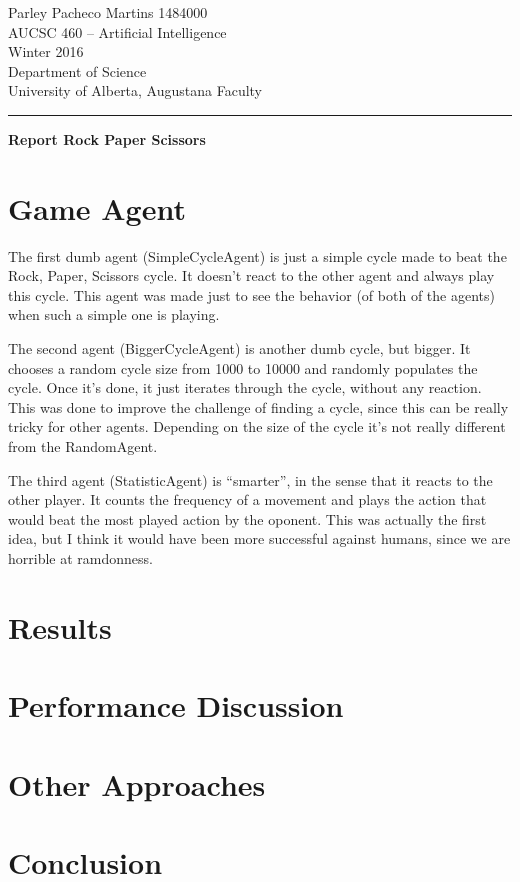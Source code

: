 \documentclass[12pt]{article}
\begin{document}
\noindent
Parley Pacheco Martins 1484000\\
AUCSC 460 -- Artificial Intelligence\\
Winter 2016\\
Department of Science\\
University of Alberta, Augustana Faculty

\vspace*{0.75\baselineskip}
\hrule
\vspace*{0.75\baselineskip}

\noindent
{\Large\bf Report Rock Paper Scissors }

\section{Game Agent}

The first dumb agent (SimpleCycleAgent) is just a simple cycle made to beat the Rock, Paper, Scissors cycle.
It doesn't react to the other agent and always play this cycle.
This agent was made just to see the behavior (of both of the agents) when such a simple one is playing.

The second agent (BiggerCycleAgent) is another dumb cycle, but bigger.
It chooses a random cycle size from 1000 to 10000 and randomly populates the cycle.
Once it's done, it just iterates through the cycle, without any reaction.
This was done to improve the challenge of finding a cycle, since this can be really tricky for other agents.
Depending on the size of the cycle it's not really different from the RandomAgent.

The third agent (StatisticAgent) is ``smarter'', in the sense that it reacts to the other player.
It counts the frequency of a movement and plays the action that would beat the most played action by the oponent.
This was actually the first idea, but I think it would have been more successful against humans, since we are horrible at ramdonness.



\section{Results}

\section{Performance Discussion}

\section{Other Approaches}

\section{Conclusion}
\end{document}
